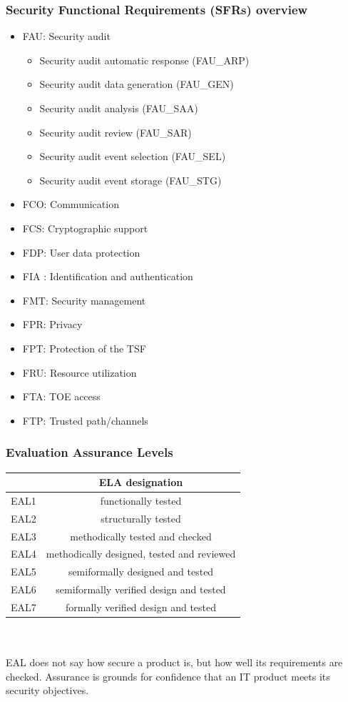 \documentclass[a4paper, 12pt]{article}
\begin{document}
	\subsubsection{Security Functional Requirements (SFRs) overview}
		\begin{itemize}
			\item	FAU: Security audit
			\begin{itemize}
				\item Security audit automatic response (FAU\_ARP)
				\item Security audit data generation (FAU\_GEN)
				\item Security audit analysis (FAU\_SAA)
				\item Security audit review (FAU\_SAR)
				\item Security audit event selection (FAU\_SEL)
				\item Security audit event storage (FAU\_STG)
			\end{itemize}
			\item	FCO: Communication
			\item	FCS: Cryptographic support
			\item	FDP: User data protection
			\item	FIA : Identification and authentication
			\item	FMT: Security management
			\item	FPR: Privacy
			\item	FPT: Protection of the TSF
			\item	FRU: Resource utilization
			\item	FTA: TOE access
			\item	FTP: Trusted path/channels
		\end{itemize}
	\subsubsection{Evaluation Assurance Levels}
		\begin{tabular}{|c|c|} \hline
		\textbf{} & \textbf{ELA designation} \\ \hline
			EAL1 & functionally tested \\ \hline
			EAL2 & structurally tested \\ \hline
			EAL3 & methodically tested and checked \\ \hline
			EAL4 & methodically designed, tested and reviewed \\ \hline
			EAL5 & semiformally designed and tested \\ \hline
			EAL6 & semiformally verified design and tested \\ \hline
			EAL7 & formally verified design and tested \\ \hline
		\end{tabular} \\ \\
		EAL does not say how secure a product is, but how well its requirements are checked.
		Assurance is grounds for confidence that an IT product meets its security objectives.
\end{document}
